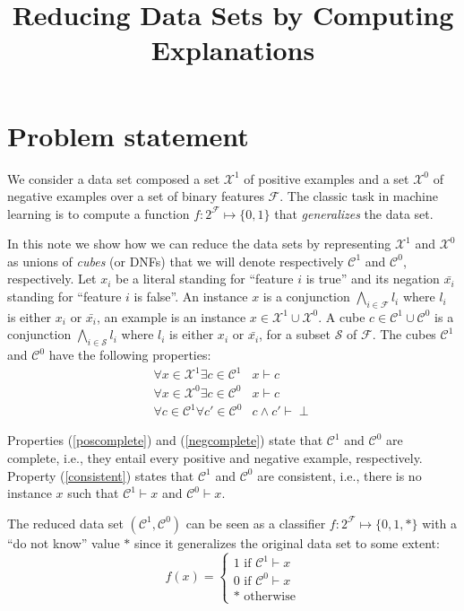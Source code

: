 \documentclass{article}
\title{Reducing Data Sets by Computing Explanations}
\newcommand{\setex}[1]{\ensuremath{{\mathcal X}^{#1}}\xspace}
\newcommand{\posex}{{\setex{1}}\xspace}
\newcommand{\negex}{{\setex{0}}\xspace}
\newcommand{\setcube}[1]{\ensuremath{{\mathcal C}^{#1}}\xspace}
\newcommand{\poscube}{{\setcube{1}}\xspace}
\newcommand{\negcube}{{\setcube{0}}\xspace}
\newcommand{\features}{\ensuremath{{\mathcal F}}\xspace}
\newcommand{\classifier}{\ensuremath{f}}
\newcommand{\lit}[1]{\ensuremath{l_{#1}}}
\newcommand{\var}{\ensuremath{x}}
\newcommand{\truelit}[1]{\ensuremath{\var_{#1}}}
\newcommand{\falselit}[1]{\ensuremath{\bar{\var_{#1}}}}
\newcommand{\ex}{\ensuremath{\var}}
\newcommand{\cube}{\ensuremath{c}}
\begin{document}

\maketitle

\section*{Problem statement}

We consider a data set composed a set \posex of positive examples and a set \negex of negative examples over a set of binary features $\features$.
The classic task in machine learning is to compute a function $\classifier : 2^{\features} \mapsto \{0,1\}$ that \emph{generalizes} the data set.

In this note we show how we can reduce the data sets by representing \posex and \negex as unions of \emph{cubes} (or DNFs) that we will denote respectively \poscube and \negcube, respectively. Let $\truelit{i}$ be a literal standing for ``feature $i$ is true'' and its negation $\falselit{i}$ standing for ``feature $i$ is false''. An instance $\ex$ is a conjunction $\bigwedge_{i \in \features}\lit{i}$ where $\lit{i}$ is either $\truelit{i}$ or $\falselit{i}$, an example is an instance $\ex \in \posex \cup \negex$.
A cube $\cube \in \poscube \cup \negcube$ is a conjunction $\bigwedge_{i \in {\mathcal S}}\lit{i}$ where $\lit{i}$ is either $\truelit{i}$ or $\falselit{i}$, for a subset ${\mathcal S}$ of \features.
The cubes \poscube and \negcube have the following properties:
\begin{eqnarray}
	\forall \ex \in \posex \exists \cube \in \poscube & \ex \vdash \cube \label{poscomplete} \\
	\forall \ex \in \negex \exists \cube \in \negcube & \ex \vdash \cube \label{negcomplete} \\
	\forall \cube \in \poscube  \forall \cube' \in \negcube  & \cube \wedge \cube' \vdash \perp \label{consistent}
\end{eqnarray}

Properties (\ref{poscomplete}) and (\ref{negcomplete}) state that \poscube and \negcube are complete, i.e., they entail every positive and negative example, respectively. Property (\ref{consistent}) states that \poscube and \negcube are consistent, i.e., there is no instance $\ex$ such that $\poscube \vdash \ex$ and $\negcube \vdash \ex$.

 The reduced data set $(\poscube,\negcube)$ can be seen as a classifier $\classifier : 2^{\features} \mapsto \{0,1,*\}$ with a ``do not know'' value $*$ since it generalizes the original data set to some extent:
 $$
 \classifier(\ex) = \begin{cases} 1 \textrm{~if~} \poscube \vdash \ex\\ 0 \textrm{~if~} \negcube \vdash \ex\\ * \textrm{~otherwise} \end{cases}
 $$
 
\end{document}
